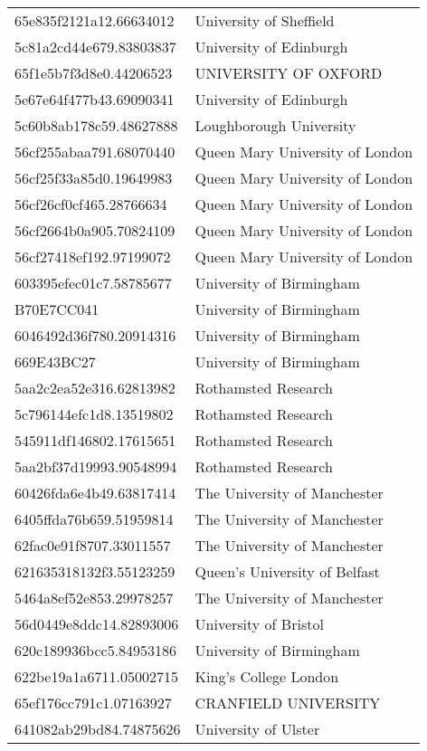 \begin{tabular}{ll}
65e835f2121a12.66634012 & University of Sheffield \\
5c81a2cd44e679.83803837 & University of Edinburgh \\
65f1e5b7f3d8e0.44206523 & UNIVERSITY OF OXFORD \\
5e67e64f477b43.69090341 & University of Edinburgh \\
5c60b8ab178c59.48627888 & Loughborough University \\
56cf255abaa791.68070440 & Queen Mary University of London \\
56cf25f33a85d0.19649983 & Queen Mary University of London \\
56cf26cf0cf465.28766634 & Queen Mary University of London \\
56cf2664b0a905.70824109 & Queen Mary University of London \\
56cf27418ef192.97199072 & Queen Mary University of London \\
603395efec01c7.58785677 & University of Birmingham \\
B70E7CC041 & University of Birmingham \\
6046492d36f780.20914316 & University of Birmingham \\
669E43BC27 & University of Birmingham \\
5aa2c2ea52e316.62813982 & Rothamsted Research \\
5c796144efc1d8.13519802 & Rothamsted Research \\
545911df146802.17615651 & Rothamsted Research \\
5aa2bf37d19993.90548994 & Rothamsted Research \\
60426fda6e4b49.63817414 & The University of Manchester \\
6405ffda76b659.51959814 & The University of Manchester \\
62fac0e91f8707.33011557 & The University of Manchester \\
621635318132f3.55123259 & Queen's University of Belfast \\
5464a8ef52e853.29978257 & The University of Manchester \\
56d0449e8ddc14.82893006 & University of Bristol \\
620c189936bcc5.84953186 & University of Birmingham \\
622be19a1a6711.05002715 & King's College London \\
65ef176cc791c1.07163927 & CRANFIELD UNIVERSITY \\
641082ab29bd84.74875626 & University of Ulster \\

\end{tabular}
